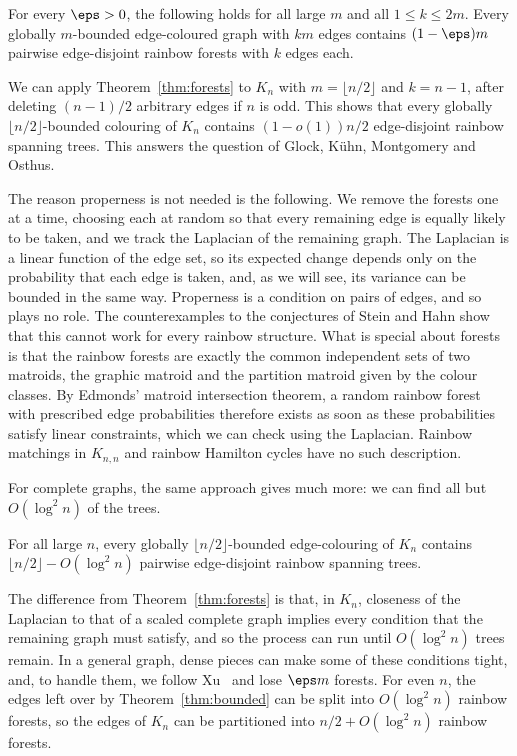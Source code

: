 \begin{theorem}\label{thm:forests}
For every $\eps>0$, the following holds for all large $m$ and all $1\le k\le 2m$.
Every globally $m$-bounded edge-coloured graph with $km$ edges contains $(1-\eps)m$ pairwise edge-disjoint rainbow forests with $k$ edges each.
\end{theorem}

We can apply Theorem~\ref{thm:forests} to $K_n$ with $m=\lfloor n/2\rfloor$ and $k=n-1$, after deleting $(n-1)/2$ arbitrary edges if $n$ is odd.
This shows that every globally $\lfloor n/2\rfloor$-bounded colouring of $K_n$ contains $(1-o(1))n/2$ edge-disjoint rainbow spanning trees.
This answers the question of Glock, K\"uhn, Montgomery and Osthus.

The reason properness is not needed is the following.
We remove the forests one at a time, choosing each at random so that every remaining edge is equally likely to be taken, and we track the Laplacian of the remaining graph.
The Laplacian is a linear function of the edge set, so its expected change depends only on the probability that each edge is taken, and, as we will see, its variance can be bounded in the same way.
Properness is a condition on pairs of edges, and so plays no role.
The counterexamples to the conjectures of Stein and Hahn show that this cannot work for every rainbow structure.
What is special about forests is that the rainbow forests are exactly the common independent sets of two matroids, the graphic matroid and the partition matroid given by the colour classes.
By Edmonds' matroid intersection theorem, a random rainbow forest with prescribed edge probabilities therefore exists as soon as these probabilities satisfy linear constraints, which we can check using the Laplacian.
Rainbow matchings in $K_{n,n}$ and rainbow Hamilton cycles have no such description.

For complete graphs, the same approach gives much more: we can find all but $O(\log^2n)$ of the trees.

\begin{theorem}\label{thm:bounded}
For all large $n$, every globally $\lfloor n/2\rfloor$-bounded edge-colouring of $K_n$ contains $\lfloor n/2\rfloor-O(\log^2n)$ pairwise edge-disjoint rainbow spanning trees.
\end{theorem}

The difference from Theorem~\ref{thm:forests} is that, in $K_n$, closeness of the Laplacian to that of a scaled complete graph implies every condition that the remaining graph must satisfy, and so the process can run until $O(\log^2 n)$ trees remain.
In a general graph, dense pieces can make some of these conditions tight, and, to handle them, we follow Xu~\cite{Xu} and lose $\eps m$ forests.
For even $n$, the edges left over by Theorem~\ref{thm:bounded} can be split into $O(\log^2 n)$ rainbow forests, so the edges of $K_n$ can be partitioned into $n/2+O(\log^2n)$ rainbow forests.

